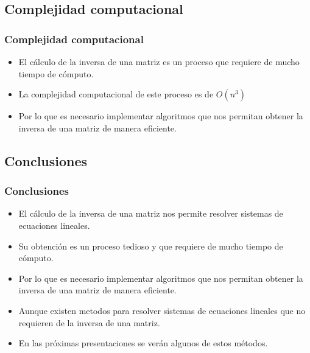 \documentclass{beamer}
\begin{document}
    \subsection{Complejidad computacional}

    \begin{frame}
        \frametitle{Complejidad computacional}
        \begin{itemize}
            \item El cálculo de la inversa de una matriz es un proceso que requiere de mucho tiempo de cómputo.\\
            \item La complejidad computacional de este proceso es de $O(n^3)$\\
            \item Por lo que es necesario implementar algoritmos que nos permitan obtener la inversa de una matriz de manera eficiente.\\
        \end{itemize}
    \end{frame}

    \subsection{Conclusiones}
    \begin{frame}
        \frametitle{Conclusiones}
        \begin{itemize}
            \item El cálculo de la inversa de una matriz nos permite resolver sistemas de ecuaciones lineales.\\
            \item Su obtención es un proceso tedioso y que requiere de mucho tiempo de cómputo.\\
            \item Por lo que es necesario implementar algoritmos que nos permitan obtener la inversa de una matriz de manera eficiente.\\
            \item Aunque existen metodos para resolver sistemas de ecuaciones lineales que no requieren de la inversa de una matriz.\\
            \item En las próximas presentaciones se verán algunos de estos métodos.
        \end{itemize}
    \end{frame}
\end{document}
